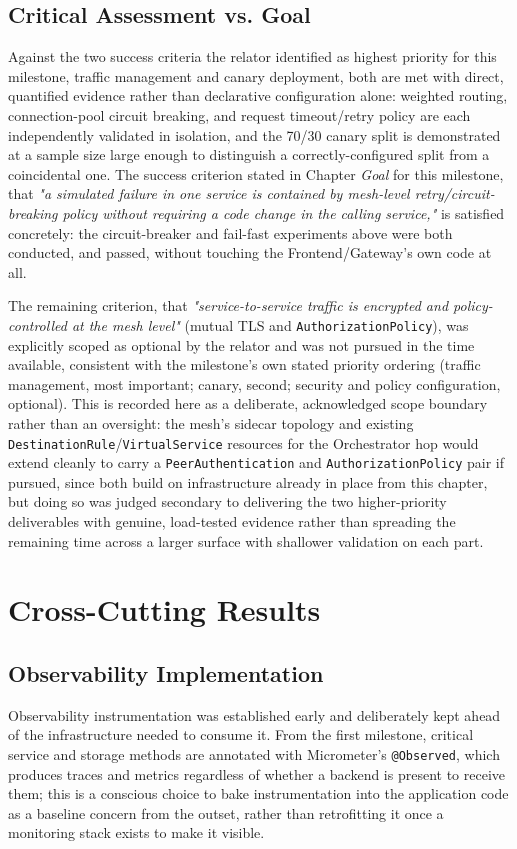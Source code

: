 \documentclass[twoside]{supsistudent}
\begin{document}
\subsection{Critical Assessment vs. Goal}
Against the two success criteria the relator identified as highest priority for this milestone, traffic management and canary deployment, both are met with direct, quantified evidence rather than declarative configuration alone: weighted routing, connection-pool circuit breaking, and request timeout/retry policy are each independently validated in isolation, and the 70/30 canary split is demonstrated at a sample size large enough to distinguish a correctly-configured split from a coincidental one. The success criterion stated in Chapter \emph{Goal} for this milestone, that \emph{"a simulated failure in one service is contained by mesh-level retry/circuit-breaking policy without requiring a code change in the calling service,"} is satisfied concretely: the circuit-breaker and fail-fast experiments above were both conducted, and passed, without touching the Frontend/Gateway's own code at all.

The remaining criterion, that \emph{"service-to-service traffic is encrypted and policy-controlled at the mesh level"} (mutual TLS and \texttt{AuthorizationPolicy}), was explicitly scoped as optional by the relator and was not pursued in the time available, consistent with the milestone's own stated priority ordering (traffic management, most important; canary, second; security and policy configuration, optional). This is recorded here as a deliberate, acknowledged scope boundary rather than an oversight: the mesh's sidecar topology and existing \texttt{DestinationRule}/\texttt{VirtualService} resources for the Orchestrator hop would extend cleanly to carry a \texttt{PeerAuthentication} and \texttt{AuthorizationPolicy} pair if pursued, since both build on infrastructure already in place from this chapter, but doing so was judged secondary to delivering the two higher-priority deliverables with genuine, load-tested evidence rather than spreading the remaining time across a larger surface with shallower validation on each part.


\section{Cross-Cutting Results}

\subsection{Observability Implementation}
Observability instrumentation was established early and deliberately kept ahead of the infrastructure needed to consume it. From the first milestone, critical service and storage methods are annotated with Micrometer's \texttt{@Observed}, which produces traces and metrics regardless of whether a backend is present to receive them; this is a conscious choice to bake instrumentation into the application code as a baseline concern from the outset, rather than retrofitting it once a monitoring stack exists to make it visible.
\end{document}
